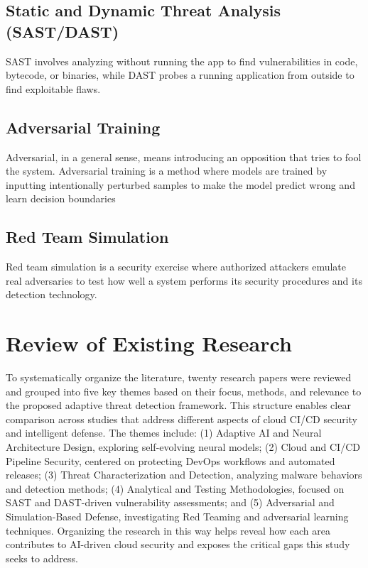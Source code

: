\subsection{Static and Dynamic Threat Analysis (SAST/DAST)}
SAST involves analyzing without running the app to find vulnerabilities in code, bytecode, or binaries, while DAST probes a running application from outside to find exploitable flaws.

\subsection{Adversarial Training}
Adversarial, in a general sense, means introducing an opposition that tries to fool the system. Adversarial training is a method where models are trained by inputting intentionally perturbed samples to make the model predict wrong and learn decision boundaries 


\subsection{Red Team Simulation}
Red team simulation is a security exercise where authorized attackers emulate real adversaries to test how well a system performs its security procedures and its detection technology.


\section{Review of Existing Research}
To systematically organize the literature, twenty research papers were reviewed and grouped into five key themes based on their focus, methods, and relevance to the proposed adaptive threat detection framework. This structure enables clear comparison across studies that address different aspects of cloud CI/CD security and intelligent defense. The themes include: (1) Adaptive AI and Neural Architecture Design, exploring self-evolving neural models; (2) Cloud and CI/CD Pipeline Security, centered on protecting DevOps workflows and automated releases; (3) Threat Characterization and Detection, analyzing malware behaviors and detection methods; (4) Analytical and Testing Methodologies, focused on SAST and DAST-driven vulnerability assessments; and (5) Adversarial and Simulation-Based Defense, investigating Red Teaming and adversarial learning techniques. Organizing the research in this way helps reveal how each area contributes to AI-driven cloud security and exposes the critical gaps this study seeks to address.\\

